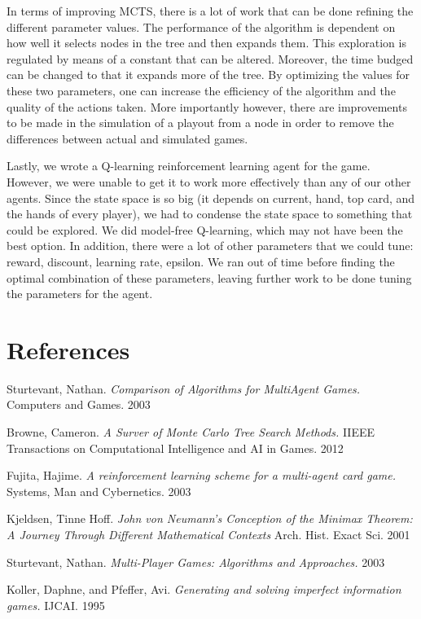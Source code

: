 \documentclass[11pt]{article}
\begin{document}
In terms of improving MCTS, there is a lot of work that can be done refining the different parameter values. The performance of the algorithm is dependent on how well it selects nodes in the tree and then expands them. This exploration is regulated by means of a constant that can be altered. Moreover, the time budged can be changed to that it expands more of the tree. By optimizing the values for these two parameters, one can increase the efficiency of the algorithm and the quality of the actions taken. More importantly however, there are improvements to be made in the simulation of a playout from a node in order to remove the differences between actual and simulated games.

Lastly, we wrote a Q-learning reinforcement learning agent for the game. However, we were unable to get it to work more effectively than any of our other agents. Since the state space is so big (it depends on current, hand, top card, and the hands of every player), we had to condense the state space to something that could be explored. We did model-free Q-learning, which may not have been the best option. In addition, there were a lot of other parameters that we could tune: reward, discount, learning rate, epsilon. We ran out of time before finding the optimal combination of these parameters, leaving further work to be done tuning the parameters for the agent.

\section{References}

\begin{thebibliography}{5}

	Sturtevant, Nathan.
	\emph{Comparison of Algorithms for MultiAgent Games.}
	Computers and Games.
	2003

	Browne, Cameron.
	\emph{A Surver of Monte Carlo Tree Search Methods.}
	IIEEE Transactions on Computational Intelligence and AI in Games. 
	2012

	Fujita, Hajime.
	\emph{A reinforcement learning scheme for a multi-agent card game.}
	Systems, Man and Cybernetics.
	2003

	Kjeldsen, Tinne Hoff.
	\emph{John von Neumann’s Conception of the Minimax Theorem: A Journey Through Different Mathematical Contexts}
	Arch. Hist. Exact Sci.
	2001
	
	Sturtevant, Nathan.
	\emph{Multi-Player Games: Algorithms and Approaches.}
	2003
	
	Koller, Daphne, and Pfeffer, Avi.
	\emph{Generating and solving imperfect information games.}
	IJCAI.
	1995
	
\end{thebibliography}
\end{document}
